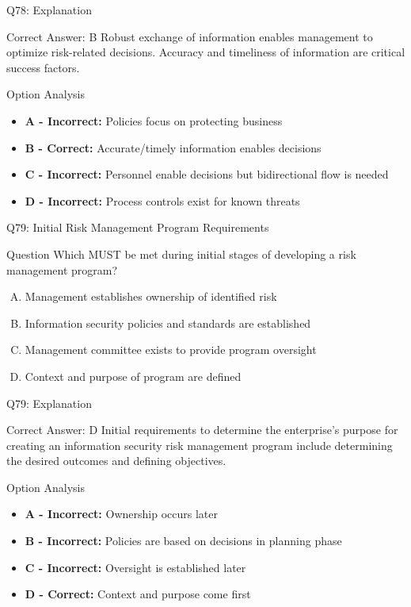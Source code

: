 \documentclass{beamer}
\begin{document}
	\begin{frame}{Q78: Explanation}
		\begin{block}{Correct Answer: B}
			Robust exchange of information enables management to optimize risk-related decisions. Accuracy and timeliness of information are critical success factors.
		\end{block}
		\begin{block}{Option Analysis}
			\begin{itemize}
				\item \textbf{A - Incorrect:} Policies focus on protecting business
				\item \textbf{B - Correct:} Accurate/timely information enables decisions
				\item \textbf{C - Incorrect:} Personnel enable decisions but bidirectional flow is needed
				\item \textbf{D - Incorrect:} Process controls exist for known threats
			\end{itemize}
		\end{block}
	\end{frame}
	
	\begin{frame}{Q79: Initial Risk Management Program Requirements}
		\begin{block}{Question}
			Which MUST be met during initial stages of developing a risk management program?
		\end{block}
		\begin{enumerate}[(A)]
			\item Management establishes ownership of identified risk
			\item Information security policies and standards are established
			\item Management committee exists to provide program oversight
			\item Context and purpose of program are defined
		\end{enumerate}
	\end{frame}
	
	\begin{frame}{Q79: Explanation}
		\begin{block}{Correct Answer: D}
			Initial requirements to determine the enterprise's purpose for creating an information security risk management program include determining the desired outcomes and defining objectives.
		\end{block}
		\begin{block}{Option Analysis}
			\begin{itemize}
				\item \textbf{A - Incorrect:} Ownership occurs later
				\item \textbf{B - Incorrect:} Policies are based on decisions in planning phase
				\item \textbf{C - Incorrect:} Oversight is established later
				\item \textbf{D - Correct:} Context and purpose come first
			\end{itemize}
		\end{block}
	\end{frame}
	
\end{document}
